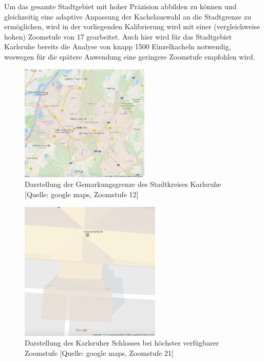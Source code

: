 \documentclass[12pt,a4paper]{scrartcl}
\begin{document}
Um das gesamte Stadtgebiet mit hoher Präzision abbilden zu können und gleichzeitig eine adaptive Anpassung der Kachelauswahl an die Stadtgrenze zu ermöglichen, wird in der vorliegenden Kalibrierung wird mit einer (vergleichweise hohen) Zoomstufe von 17 gearbeitet. Auch hier wird für das Stadtgebiet Karlsruhe bereits die Analyse von knapp 1500 Einzelkacheln notwendig, weswegen für die spätere Anwendung eine geringere Zoomstufe empfohlen wird.\\
\newline
%
\begin{figure}
  \centering
    \includegraphics[width=0.55\textwidth]{images/3_Stadtgebiet_KA_zoom12.png}
    \caption{Darstellung der Gemarkungsgrenze des Stadtkreises Karlsruhe [Quelle: google maps, Zoomstufe 12]}
    \label{fig:Stadtgebiet_KA}
\end{figure}
%
\begin{figure}
  \centering
    \includegraphics[width=0.6\textwidth]{images/3_KA_Schloss_zoom21.png}
    \caption{Darstellung des Karlsruher Schlosses bei höchster verfügbarer Zoomstufe [Quelle: google maps, Zoomstufe 21]}
    \label{fig:Schloss_KA}
\end{figure}
\end{document}
